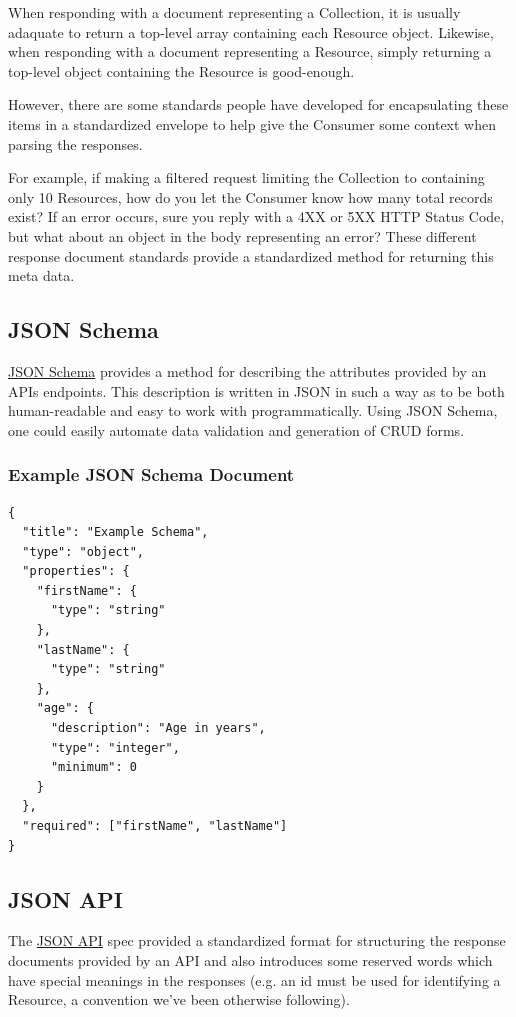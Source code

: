 \documentclass{book}
\begin{document}
When responding with a document representing a Collection, it is usually adaquate to return a top-level array containing each Resource object. Likewise, when responding with a document representing a Resource, simply returning a top-level object containing the Resource is good-enough.

However, there are some standards people have developed for encapsulating these items in a standardized envelope to help give the Consumer some context when parsing the responses.

For example, if making a filtered request limiting the Collection to containing only 10 Resources, how do you let the Consumer know how many total records exist? If an error occurs, sure you reply with a 4XX or 5XX HTTP Status Code, but what about an object in the body representing an error? These different response document standards provide a standardized method for returning this meta data.

\subsection{JSON Schema}

\href{http://json-schema.org/}{JSON Schema} provides a method for describing the attributes provided by an APIs endpoints. This description is written in JSON in such a way as to be both human-readable and easy to work with programmatically. Using JSON Schema, one could easily automate data validation and generation of CRUD forms.

\subsubsection{Example JSON Schema Document}

\begin{verbatim}
{
  "title": "Example Schema",
  "type": "object",
  "properties": {
    "firstName": {
      "type": "string"
    },
    "lastName": {
      "type": "string"
    },
    "age": {
      "description": "Age in years",
      "type": "integer",
      "minimum": 0
    }
  },
  "required": ["firstName", "lastName"]
}
\end{verbatim}

\subsection{JSON API}

The \href{http://jsonapi.org/}{JSON API} spec provided a standardized format for structuring the response documents provided by an API and also introduces some reserved words which have special meanings in the responses (e.g. an id must be used for identifying a Resource, a convention we've been otherwise following).
\end{document}
